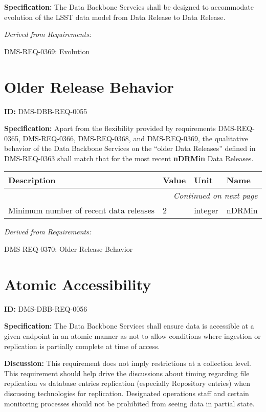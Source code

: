 \documentclass[SE,toc,lsstdraft]{lsstdoc}
\makeatletter
\newcommand{\paramname}[1]{\hspace{0pt}#1}
\newcommand{\unitname}[1]{\hspace{0pt}#1}
\newcommand{\addendum}{}
\newenvironment{parameters}[0]{%
\setlength\LTleft{0pt}
\setlength\LTright{\fill}
\begin{small}
\begin{longtable}[]{|p{0.49\textwidth}|l|p{0.6in}|p{1.70in}@{}|}

\hline \textbf{Description} & \textbf{Value} & \textbf{Unit} & \textbf{Name} \\ \hline
\endhead

\hline \multicolumn{4}{r}{\emph{Continued on next page}} \\
\endfoot

\hline\hline
\endlastfoot
}{%
\hline
\end{longtable}
\end{small}
}
\makeatother
\begin{document}
\textbf{Specification:}
The Data Backbone Servcies shall be designed to accommodate evolution of the LSST data model from Data Release to Data Release.

\emph{Derived from Requirements:}

DMS-REQ-0369:
Evolution \newline

\section{Older Release Behavior}

\label{DMS-DBB-REQ-0055}
\textbf{ID:} DMS-DBB-REQ-0055

\textbf{Specification:}
Apart from the flexibility provided by requirements DMS-REQ-0365, DMS-REQ-0366, DMS-REQ-0368, and DMS-REQ-0369, the qualitative behavior of the Data Backbone Services on the “older Data Releases” defined in DMS-REQ-0363 shall match that for the most recent \textbf{nDRMin} Data Releases.

\begin{parameters}
Minimum number of recent data releases
&
2
&
\unitname{%
integer
}
&
\paramname{%
nDRMin
} \\\hline
\end{parameters}

\emph{Derived from Requirements:}

DMS-REQ-0370:
Older Release Behavior \newline

\section{Atomic Accessibility}

\label{DMS-DBB-REQ-0056}
\textbf{ID:} DMS-DBB-REQ-0056

\textbf{Specification:}
The Data Backbone Services shall ensure data is accessible at a given endpoint in an atomic manner as not to allow conditions where ingestion or replication is partially complete at time of access.

\textbf{Discussion:}
This requirement does not imply restrictions at a collection level.  This requirement should help drive the discussions about timing regarding file replication vs database entries replication (especially Repository entries) when discussing technologies for replication.    Designated operations staff and certain monitoring processes should not be prohibited from seeing data in partial state.

\addendum


\end{document}

